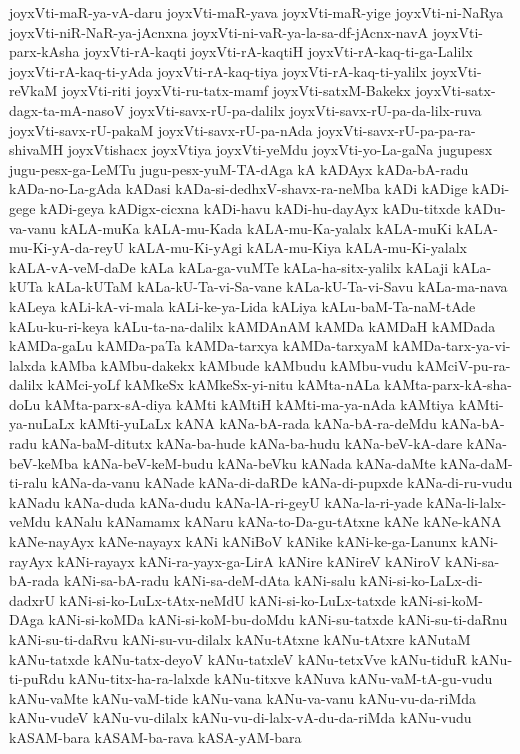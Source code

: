 {joyxVti-maR-ya-vA-daru
joyxVti-maR-yava
joyxVti-maR-yige
joyxVti-ni-NaRya
joyxVti-niR-NaR-ya-jAcnxna
joyxVti-ni-vaR-ya-la-sa-df-jAcnx-navA
joyxVti-parx-kAsha
joyxVti-rA-kaqti
joyxVti-rA-kaqtiH
joyxVti-rA-kaq-ti-ga-Lalilx
joyxVti-rA-kaq-ti-yAda
joyxVti-rA-kaq-tiya
joyxVti-rA-kaq-ti-yalilx
joyxVti-reVkaM
joyxVti-riti
joyxVti-ru-tatx-mamf
joyxVti-satxM-Bakekx
joyxVti-satx-dagx-ta-mA-nasoV
joyxVti-savx-rU-pa-dalilx
joyxVti-savx-rU-pa-da-lilx-ruva
joyxVti-savx-rU-pakaM
joyxVti-savx-rU-pa-nAda
joyxVti-savx-rU-pa-pa-ra-shivaMH
joyxVtishacx
joyxVtiya
joyxVti-yeMdu
joyxVti-yo-La-gaNa
jugupesx
jugu-pesx-ga-LeMTu
jugu-pesx-yuM-TA-dAga
kA
kADAyx
kADa-bA-radu
kADa-no-La-gAda
kADasi
kADa-si-dedhxV-shavx-ra-neMba
kADi
kADige
kADi-gege
kADi-geya
kADigx-cicxna
kADi-havu
kADi-hu-dayAyx
kADu-titxde
kADu-va-vanu
kALA-muKa
kALA-mu-Kada
kALA-mu-Ka-yalalx
kALA-muKi
kALA-mu-Ki-yA-da-reyU
kALA-mu-Ki-yAgi
kALA-mu-Kiya
kALA-mu-Ki-yalalx
kALA-vA-veM-daDe
kALa
kALa-ga-vuMTe
kALa-ha-sitx-yalilx
kALaji
kALa-kUTa
kALa-kUTaM
kALa-kU-Ta-vi-Sa-vane
kALa-kU-Ta-vi-Savu
kALa-ma-nava
kALeya
kALi-kA-vi-mala
kALi-ke-ya-Lida
kALiya
kALu-baM-Ta-naM-tAde
kALu-ku-ri-keya
kALu-ta-na-dalilx
kAMDAnAM
kAMDa
kAMDaH
kAMDada
kAMDa-gaLu
kAMDa-paTa
kAMDa-tarxya
kAMDa-tarxyaM
kAMDa-tarx-ya-vi-lalxda
kAMba
kAMbu-dakekx
kAMbude
kAMbudu
kAMbu-vudu
kAMciV-pu-ra-dalilx
kAMci-yoLf
kAMkeSx
kAMkeSx-yi-nitu
kAMta-nALa
kAMta-parx-kA-sha-doLu
kAMta-parx-sA-diya
kAMti
kAMtiH
kAMti-ma-ya-nAda
kAMtiya
kAMti-ya-nuLaLx
kAMti-yuLaLx
kANA
kANa-bA-rada
kANa-bA-ra-deMdu
kANa-bA-radu
kANa-baM-ditutx
kANa-ba-hude
kANa-ba-hudu
kANa-beV-kA-dare
kANa-beV-keMba
kANa-beV-keM-budu
kANa-beVku
kANada
kANa-daMte
kANa-daM-ti-ralu
kANa-da-vanu
kANade
kANa-di-daRDe
kANa-di-pupxde
kANa-di-ru-vudu
kANadu
kANa-duda
kANa-dudu
kANa-lA-ri-geyU
kANa-la-ri-yade
kANa-li-lalx-veMdu
kANalu
kANamamx
kANaru
kANa-to-Da-gu-tAtxne
kANe
kANe-kANA
kANe-nayAyx
kANe-nayayx
kANi
kANiBoV
kANike
kANi-ke-ga-Lanunx
kANi-rayAyx
kANi-rayayx
kANi-ra-yayx-ga-LirA
kANire
kANireV
kANiroV
kANi-sa-bA-rada
kANi-sa-bA-radu
kANi-sa-deM-dAta
kANi-salu
kANi-si-ko-LaLx-di-dadxrU
kANi-si-ko-LuLx-tAtx-neMdU
kANi-si-ko-LuLx-tatxde
kANi-si-koM-DAga
kANi-si-koMDa
kANi-si-koM-bu-doMdu
kANi-su-tatxde
kANi-su-ti-daRnu
kANi-su-ti-daRvu
kANi-su-vu-dilalx
kANu-tAtxne
kANu-tAtxre
kANutaM
kANu-tatxde
kANu-tatx-deyoV
kANu-tatxleV
kANu-tetxVve
kANu-tiduR
kANu-ti-puRdu
kANu-titx-ha-ra-lalxde
kANu-titxve
kANuva
kANu-vaM-tA-gu-vudu
kANu-vaMte
kANu-vaM-tide
kANu-vana
kANu-va-vanu
kANu-vu-da-riMda
kANu-vudeV
kANu-vu-dilalx
kANu-vu-di-lalx-vA-du-da-riMda
kANu-vudu
kASAM-bara
kASAM-ba-rava
kASA-yAM-bara
}
